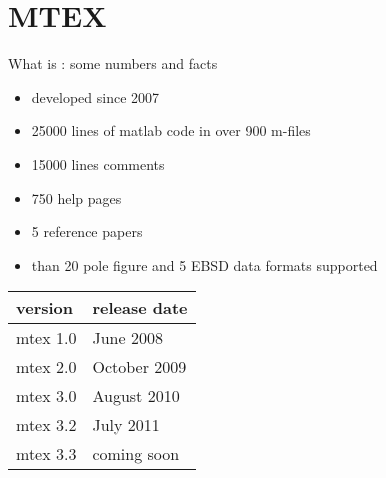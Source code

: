 
\frame[plain]{\titlepage}


\section{MTEX}


\begin{frame}{What is \MTEX: some numbers and facts}


\begin{block}{}

\begin{itemize}
\item developed since 2007
\item 25000 lines of matlab code in over 900 m-files
\item 15000 lines comments
\item 750 help pages
\item 5 reference papers
\item than 20 pole figure and 5 EBSD data formats supported
\end{itemize}
\end{block}

\begin{block}{}
  \vspace*{0.25em}
  \hspace{1.25em}
  \begin{tabular}{ll}
    version & release date \\
    \toprule
    mtex 1.0 & June 2008 \\
    mtex 2.0 & October 2009 \\
    mtex 3.0 & August 2010 \\
    mtex 3.2 & July 2011 \\
    mtex 3.3 & coming soon
  \end{tabular}
\end{block}


\end{frame}



